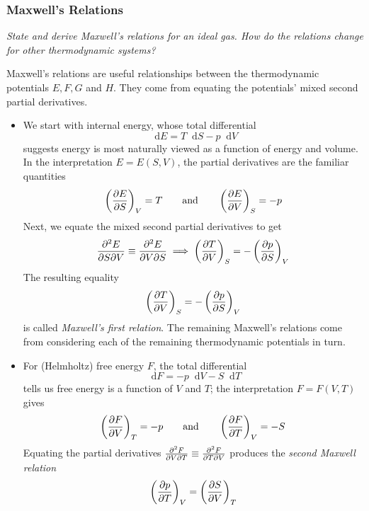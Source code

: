 \documentclass[11pt, a4paper]{article}
\newcommand{\diff}{\mathop{}\!\mathrm{d}} %
\newcommand{\pdveval}[3]{\left(\pdv{#1}{#2}\right)_{#3}}
\begin{document}
\subsubsection{Maxwell's Relations}
\textit{State and derive Maxwell's relations for an ideal gas. How do the relations change for other thermodynamic systems?}

\smallskip

Maxwell's relations are useful relationships between the thermodynamic potentials $ E, F, G $ and $ H $. They come from equating the potentials' mixed second partial derivatives.
\begin{itemize}
	\item We start with internal energy, whose total differential
	\begin{equation*}
		 \diff E = T \diff S - p \diff V 
	\end{equation*}
	suggests energy is most naturally viewed as a function of energy and volume. In the interpretation $ E = E(S, V) $, the partial derivatives are the familiar quantities
	\begin{equation*}
		\pdveval{E}{S}{V} = T \qquad \text{and} \qquad \pdveval{E}{V}{S} = - p
	\end{equation*}
	Next, we equate the mixed second partial derivatives to get
	\begin{equation*}
		\pdv{E}{S}{V} \equiv \pdv{E}{V}{S} \implies \pdveval{T}{V}{S} = - \pdveval{p}{S}{V}
	\end{equation*}
	The resulting equality 
	\begin{equation*}
		\pdveval{T}{V}{S} = - \pdveval{p}{S}{V}
	\end{equation*}
	is called \textit{Maxwell's first relation}. The remaining Maxwell's relations come from considering each of the remaining thermodynamic potentials in turn.
	
	\item For (Helmholtz) free energy $ F $, the total differential
	\begin{equation*}
		\diff F = - p \diff V - S \diff T
	\end{equation*}
	tells us free energy is a function of $ V $ and $ T $; the interpretation $ F = F(V, T) $ gives
	\begin{equation*}
		\pdveval{F}{V}{T} = - p \qquad \text{and} \qquad \pdveval{F}{T}{V} = - S
	\end{equation*}
	Equating the partial derivatives $ \pdv{F}{V}{T} \equiv \pdv{F}{T}{V} $ produces the \textit{second Maxwell relation}
	\begin{equation*}
		\pdveval{p}{T}{V} = \pdveval{S}{V}{T}
	\end{equation*}
	

\end{itemize}
\end{document}
